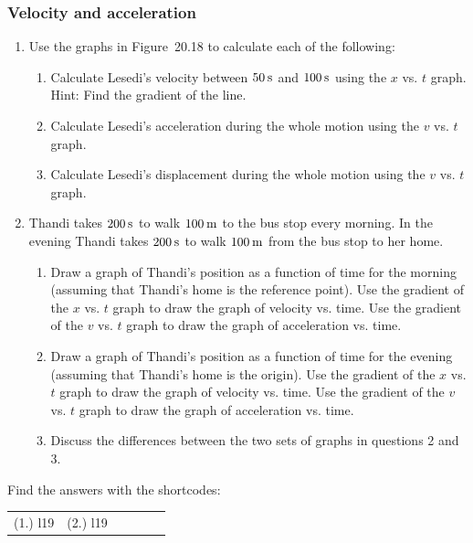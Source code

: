             \subsubsection{  Velocity and acceleration }
            \nopagebreak
        \label{m38795*id71023}\begin{enumerate}[noitemsep, label=\textbf{\arabic*}. ] 
            \label{m38795*uid94}\item Use the graphs in Figure~20.18 to calculate each of the following:
\label{m38795*id71044}\begin{enumerate}[noitemsep, label=\textbf{\alph*}. ] 
            \label{m38795*uid95}\item Calculate Lesedi's velocity between $50\phantom{\rule{2pt}{0ex}}\mathrm{s}$ and $100\phantom{\rule{2pt}{0ex}}\mathrm{s}$ using the $x$ vs. $t$ graph. Hint: Find the gradient of the line.
\label{m38795*uid96}\item Calculate Lesedi's acceleration during the whole motion using the $v$ vs. $t$ graph.
\label{m38795*uid97}\item Calculate Lesedi's displacement during the whole motion using the $v$ vs. $t$ graph.
\end{enumerate}
                \label{m38795*uid98}\item Thandi takes $200\phantom{\rule{2pt}{0ex}}\mathrm{s}$ to walk $100\phantom{\rule{2pt}{0ex}}\mathrm{m}$ to the bus stop every morning. In the evening Thandi takes $200\phantom{\rule{2pt}{0ex}}\mathrm{s}$ to walk $100\phantom{\rule{2pt}{0ex}}\mathrm{m}$ from the bus stop to her home.\label{m38795*id7103444}\begin{enumerate}[noitemsep, label=\textbf{\alph*}. ] 
            \label{m38795*uid9523}\item  Draw a graph of Thandi's position as a function of time for the morning (assuming that Thandi's home is the reference point). Use the gradient of the $x$ vs. $t$ graph to draw the graph of velocity vs. time. Use the gradient of the $v$ vs. $t$ graph to draw the graph of acceleration vs. time.
\label{m38795*uid99}\item  Draw a graph of Thandi's position as a function of time for the evening (assuming that Thandi's home is the origin). Use the gradient of the $x$ vs. $t$ graph to draw the graph of velocity vs. time. Use the gradient of the $v$ vs. $t$ graph to draw the graph of acceleration vs. time.
\label{m38795*uid100}\item Discuss the differences between the two sets of graphs in questions 2 and 3.\end{enumerate}
        \end{enumerate}
\label{m38795*secfhsst!!!underscore!!!id2603}
\par {} Find the answers with the shortcodes:
 \par \begin{tabular}[h]{cccccc}
 (1.) l19  &  (2.) l19  & \end{tabular}
